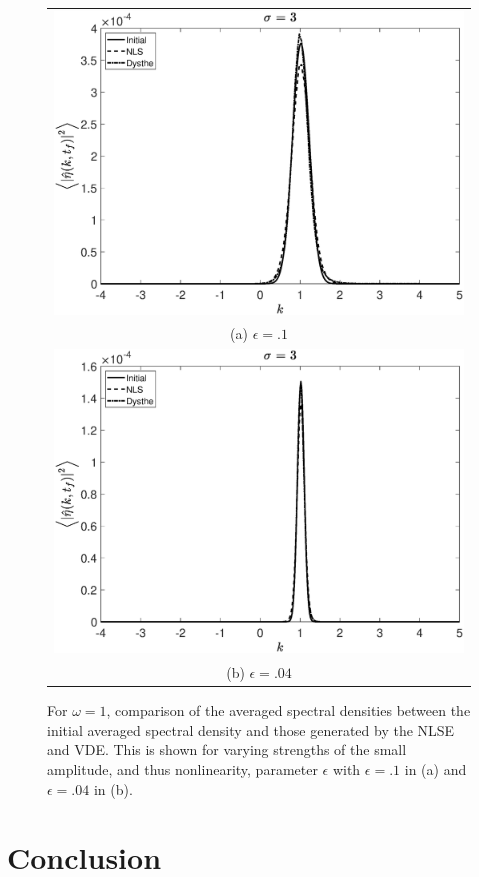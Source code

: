 \documentclass[a4paper,11pt]{article}
\begin{document}
\begin{figure}[!ht]
\centering
\begin{tabular}{c}
\includegraphics[width=.65\textwidth]{omega1_ep0pt1_width3} \\
(a) $\epsilon=.1$\\
\includegraphics[width=.65\textwidth]{omega1_ep0pt04_width3}\\
(b) $\epsilon=.04$ 
\end{tabular}
\caption{For $\omega=1$, comparison of the averaged spectral densities between the initial averaged spectral density and those generated by the NLSE and VDE.  This is shown for varying strengths of the small amplitude, and thus nonlinearity, parameter $\epsilon$ with $\epsilon=.1$ in (a) and $\epsilon=.04$ in (b).}
\label{fig:pspecom1}
\end{figure}

\section*{Conclusion}


\end{document}
